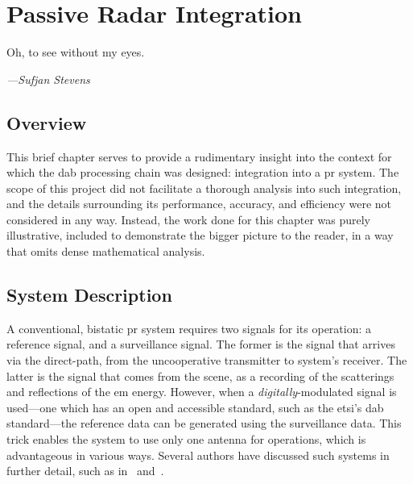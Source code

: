 \documentclass[class=report,11pt,crop=false]{standalone}
\begin{document}
\chapter{Passive Radar Integration}
\epigraph{Oh, to see without my eyes.}%
    {\emph{---Sufjan Stevens}}

\section{Overview}
This brief chapter serves to provide a rudimentary insight into the context for which the \gls{dab} processing chain was designed: integration into a \gls{pr} system. The scope of this project did not facilitate a thorough analysis into such integration, and the details surrounding its performance, accuracy, and efficiency were not considered in any way. Instead, the work done for this chapter was purely illustrative, included to demonstrate the bigger picture to the reader, in a way that omits dense mathematical analysis.

\section{System Description}
A conventional, bistatic \gls{pr} system requires two signals for its operation: a reference signal, and a surveillance signal. The former is the signal that arrives via the direct-path, from the uncooperative transmitter to system's receiver. The latter is the signal that comes from the scene, as a recording of the scatterings and reflections of the \gls{em} energy. However, when a \emph{digitally}-modulated signal is used---one which has an open and accessible standard, such as the \gls{etsi}'s \gls{dab} standard---the reference data can be generated using the surveillance data. This trick enables the system to use only one antenna for operations, which is advantageous in various ways. Several authors have discussed such systems in further detail, such as in~\cite{Fang2018} and~\cite{Barott2014}.
\end{document}
